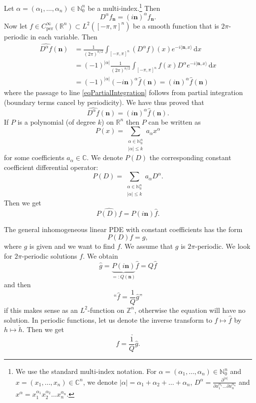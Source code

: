 \documentclass[12pt, oneside, a4paper]{article}
\def\nbf{\mathbf{n}}
\theoremstyle{dfn}
\newcommand{\scalprod}[2]{\langle #1,#2 \rangle}
\def\Cperinfty{C_{\operatorname{per}}^\infty}
\providecommand{\Lpern}[1]{L^{#1}([-\pi,\pi]^n)}
\def\Nbb{\mathbb{N}}
\def\Rbb{\ensuremath{\mathbb{R}}}
\def\Zbb{\ensuremath{\mathbb{Z}}}
\def\dx{\,\mathrm dx}
\newcommand{\Com}{\mathbb{C}}
\providecommand{\abs}[1]{\lvert#1\rvert}
\begin{document}
Let $\alpha = (\alpha_1, \ldots, \alpha_n) \in \Nbb_0^n$ be a multi-index.\footnote{We use the standard multi-index notation. For $\alpha = (\alpha_1, \ldots, \alpha_n) \in \Nbb_0^n$ and $x = (x_1, \ldots, x_n) \in \Com^n$, we denote $\abs{\alpha} = \alpha_1 + \alpha_2 + \dots + \alpha_n$, $D^\alpha = \frac{\partial^{\abs{\alpha}}}{\partial x_1^{\alpha_1} \dots \partial x_n^{\alpha_n}}$ and $x^\alpha = x_1^{\alpha_1} x_2^{\alpha_2} \dots x_n^{\alpha_n}$.} Then
	\[
	D^\alpha f_\nbf = (i\nbf)^\alpha f_\nbf.
	\]
Now let $f \in \Cperinfty(\Rbb^n) \subset \Lpern{2}$ be a smooth function that is $2\pi$-periodic in each variable. Then
	\begin{align}
	\widehat{D^\alpha f}(\nbf)
	&= \frac{1}{(2\pi)^{n/2}} \int_{[-\pi,\pi]^n} (D^\alpha f)(x) e^{-i \scalprod{\nbf}{x}} \dx \nonumber \\
	&= (-1)^{\abs{\alpha}} \frac{1}{(2\pi)^{n/2}} \int_{[-\pi,\pi]^n} f(x) D^\alpha e^{-i \scalprod{\nbf}{x}} \dx \label{eqPartialIntegration} \\
	&= (-1)^{\abs{\alpha}} (-i\nbf)^\alpha \widehat{f}(\nbf)
	= (i\nbf)^\alpha \widehat{f}(\nbf) \nonumber
	\end{align}
	where the passage to line \eqref{eqPartialIntegration} follows from partial integration (boundary terms cancel by periodicity).
	We have thus proved that
	\[
	\widehat{D^\alpha f}(\nbf) = (i\nbf)^\alpha \widehat{f}(\nbf).
	\]
If $P$ is a polynomial (of degree $k$) on $\Rbb^n$ then $P$ can be written as
	\[
	P(x) = \sum_{\substack{\alpha \in \Nbb_0^n \\ \abs{\alpha} \leqslant k}} a_\alpha x^\alpha
	\]
	for some coefficients $a_\alpha \in \Com$. We denote $P(D)$ the corresponding constant coefficient differential operator:
	\[
	P(D) = \sum_{\substack{\alpha \in \Nbb_0^n \\ \abs{\alpha} \leqslant k}} a_\alpha D^\alpha.
	\]
	Then we get
	\[
	\widehat{P(D)f} = P(i\nbf) \widehat{f}.
	\]

The general inhomogeneous linear PDE with constant coefficients has the form
\[
P(D)f = g,
\]
where $g$ is given and we want to find $f$. We assume that $g$ is $2\pi$-periodic. We look for $2\pi$-periodic solutions $f$. We obtain
\[
\widehat{g} = \underbrace{P(i\nbf)}_{=:Q(\nbf)} \widehat{f} = Q \widehat{f}
\]
and then
\[
\text{``} \widehat{f} = \frac{1}{Q} \widehat{g} \text{''}
\]
if this makes sense as an $L^2$-function on $\Zbb^n$, otherwise the equation will have no solution.
In periodic functions, let us denote the inverse transform to $f \mapsto \widehat{f}$ by $h \mapsto \check{h}$. Then we get
	\[
	f = \check{\frac{1}{Q} \widehat{g}}.
	\]
\end{document}
